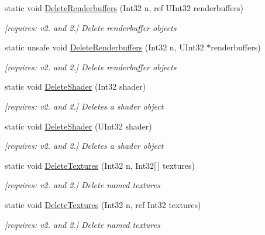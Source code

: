 \begin{DoxyCompactItemize}
static void \hyperlink{class_open_t_k_1_1_graphics_1_1_e_s20_1_1_g_l_a1151d187a0f72bda29e720e9d756939e}{Delete\-Renderbuffers} (Int32 n, ref U\-Int32 renderbuffers)
\begin{DoxyCompactList}\small\item\em \mbox{[}requires\-: v2. and 2.\mbox{]} Delete renderbuffer objects \end{DoxyCompactList}\item 
static unsafe void \hyperlink{class_open_t_k_1_1_graphics_1_1_e_s20_1_1_g_l_a11c76ad8aa01a9b3224084ca799fe733}{Delete\-Renderbuffers} (Int32 n, U\-Int32 $\ast$renderbuffers)
\begin{DoxyCompactList}\small\item\em \mbox{[}requires\-: v2. and 2.\mbox{]} Delete renderbuffer objects \end{DoxyCompactList}\item 
static void \hyperlink{class_open_t_k_1_1_graphics_1_1_e_s20_1_1_g_l_a3c76e9dac3216b65f927ac12815ae6ba}{Delete\-Shader} (Int32 shader)
\begin{DoxyCompactList}\small\item\em \mbox{[}requires\-: v2. and 2.\mbox{]} Deletes a shader object \end{DoxyCompactList}\item 
static void \hyperlink{class_open_t_k_1_1_graphics_1_1_e_s20_1_1_g_l_a10d33f7ca4e0e12ce4a5f6e112df5d50}{Delete\-Shader} (U\-Int32 shader)
\begin{DoxyCompactList}\small\item\em \mbox{[}requires\-: v2. and 2.\mbox{]} Deletes a shader object \end{DoxyCompactList}\item 
static void \hyperlink{class_open_t_k_1_1_graphics_1_1_e_s20_1_1_g_l_a51d5666b71f209635a80cee5587c0252}{Delete\-Textures} (Int32 n, Int32\mbox{[}$\,$\mbox{]} textures)
\begin{DoxyCompactList}\small\item\em \mbox{[}requires\-: v2. and 2.\mbox{]} Delete named textures \end{DoxyCompactList}\item 
static void \hyperlink{class_open_t_k_1_1_graphics_1_1_e_s20_1_1_g_l_aba8f200cfa6d3cae4d6724171666f429}{Delete\-Textures} (Int32 n, ref Int32 textures)
\begin{DoxyCompactList}\small\item\em \mbox{[}requires\-: v2. and 2.\mbox{]} Delete named textures \end{DoxyCompactList}\item 

\end{DoxyCompactItemize}
